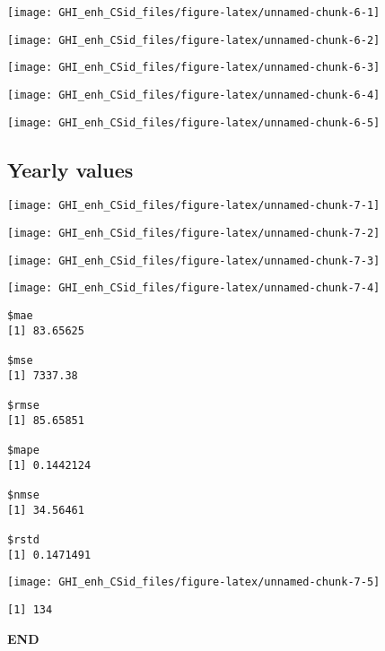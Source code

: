 \documentclass[
  10pt,
  a4paper,oneside]{article}
\begin{document}
\begin{center}\texttt{[image: GHI\_enh\_CSid\_files/figure-latex/unnamed-chunk-6-1]} \end{center}

\begin{center}\texttt{[image: GHI\_enh\_CSid\_files/figure-latex/unnamed-chunk-6-2]} \end{center}

\begin{center}\texttt{[image: GHI\_enh\_CSid\_files/figure-latex/unnamed-chunk-6-3]} \end{center}

\begin{center}\texttt{[image: GHI\_enh\_CSid\_files/figure-latex/unnamed-chunk-6-4]} \end{center}

\begin{center}\texttt{[image: GHI\_enh\_CSid\_files/figure-latex/unnamed-chunk-6-5]} \end{center}

\subsection{Yearly values}\label{yearly-values}

\begin{center}\texttt{[image: GHI\_enh\_CSid\_files/figure-latex/unnamed-chunk-7-1]} \end{center}

\begin{center}\texttt{[image: GHI\_enh\_CSid\_files/figure-latex/unnamed-chunk-7-2]} \end{center}

\begin{center}\texttt{[image: GHI\_enh\_CSid\_files/figure-latex/unnamed-chunk-7-3]} \end{center}

\begin{center}\texttt{[image: GHI\_enh\_CSid\_files/figure-latex/unnamed-chunk-7-4]} \end{center}

\begin{verbatim}
$mae
[1] 83.65625

$mse
[1] 7337.38

$rmse
[1] 85.65851

$mape
[1] 0.1442124

$nmse
[1] 34.56461

$rstd
[1] 0.1471491
\end{verbatim}

\begin{center}\texttt{[image: GHI\_enh\_CSid\_files/figure-latex/unnamed-chunk-7-5]} \end{center}

\begin{verbatim}
[1] 134
\end{verbatim}

\textbf{END}
\end{document}
